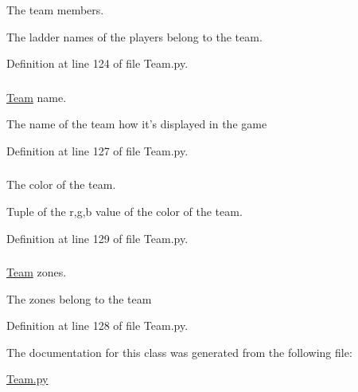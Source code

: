 The team members. 

The ladder names of the players belong to the team. 

Definition at line 124 of file Team.py.

\hypertarget{class_team_1_1_team_aa840b5c614936ab0ceb8c9a041fd63d3}{
\subsubsection[{\_\-\_\-name}]{}}
\label{class_team_1_1_team_aa840b5c614936ab0ceb8c9a041fd63d3}


\hyperlink{class_team_1_1_team}{Team} name. 

The name of the team how it's displayed in the game 

Definition at line 127 of file Team.py.

\hypertarget{class_team_1_1_team_ac98394f815e38111f61f85d60a124459}{
\subsubsection[{color}]{}}
\label{class_team_1_1_team_ac98394f815e38111f61f85d60a124459}


The color of the team. 

Tuple of the r,g,b value of the color of the team. 

Definition at line 129 of file Team.py.

\hypertarget{class_team_1_1_team_a585395bf34a71843cffaf71626138ab4}{
\subsubsection[{zones}]{}}
\label{class_team_1_1_team_a585395bf34a71843cffaf71626138ab4}


\hyperlink{class_team_1_1_team}{Team} zones. 

The zones belong to the team 

Definition at line 128 of file Team.py.



The documentation for this class was generated from the following file:\begin{DoxyCompactItemize}
\item 
\hyperlink{_team_8py}{Team.py}\end{DoxyCompactItemize}
